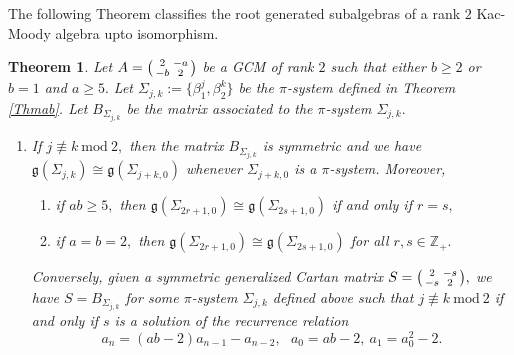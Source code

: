 \documentclass[12pt,reqno]{amsart}
\theoremstyle{plain}
\newtheorem*{thm}{Theorem}
\theoremstyle{definition}
\theoremstyle{remark}
\newcommand{\lie}[1]{\mathfrak{#1}}
\newcommand\bz{\mathbb Z}
\begin{document}
\noindent The following Theorem classifies the root generated subalgebras of a rank $2$ Kac-Moody algebra upto isomorphism.
\begin{thm}
    Let $A=\begin{psmallmatrix}
        2& -a\\ -b&2
    \end{psmallmatrix}$ be a GCM of rank $2$ such that either $b\geq 2$ or $b=1$ and $a\geq 5.$ Let $\Sigma_{j,k}:=\{\beta_1^j,\beta_2^k\}$ be the $\pi$-system defined in Theorem \ref{Thmab}. Let $B_{\Sigma_{j,k}}$ be the matrix associated to the $\pi$-system $\Sigma_{j,k}.$
    \begin{enumerate}
        \item If $j\not\equiv k\ \mathrm{mod}\ 2,$ then the matrix $B_{\Sigma_{j,k}}$ is symmetric and we have $\lie g(\Sigma_{j,k})\cong \lie g(\Sigma_{j+k,0})$ whenever $\Sigma_{j+k,0}$ is a $\pi$-system. Moreover, \vspace{0,2cm}
        \begin{enumerate}
            \item if $ab\geq 5,$ then $\lie g(\Sigma_{2r+1,0})\cong \lie g(\Sigma_{2s+1,0})$ if and only if $r=s,$\vspace{0,2cm}
            \item if $a=b=2,$ then $\lie g(\Sigma_{2r+1,0})\cong\lie g(\Sigma_{2s+1,0})$ for all $r,s\in\bz_+.$
        \end{enumerate}
        \medskip
        
        \noindent Conversely, given a symmetric generalized Cartan matrix $S=\begin{psmallmatrix}
            2& -s\\ -s& 2
        \end{psmallmatrix},$ we have $S=B_{\Sigma_{j,k}}$ for some $\pi$-system $\Sigma_{j,k}$ defined above such that $j\not\equiv k\ \mathrm{mod}\ 2$ if and only if $s$ is a solution of the recurrence relation
        $$a_n=(ab-2)a_{n-1}-a_{n-2},\ \ \ a_0=ab-2,\ a_1=a_0^2-2.$$
        

\end{enumerate}
\end{thm}
\end{document}
